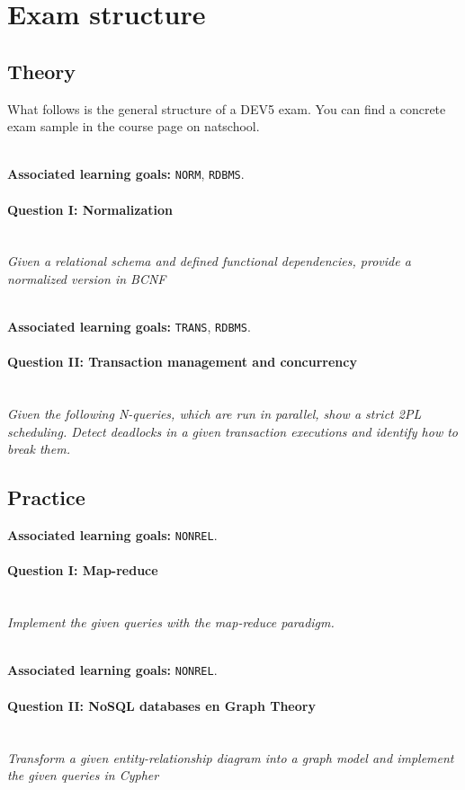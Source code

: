 \section*{Exam structure}
\subsection*{Theory}
What follows is the general structure of a DEV5 exam. You can find a concrete exam sample in the course page on natschool.


\ \\ 
\textbf{Associated learning goals:} \texttt{NORM}, \texttt{RDBMS}.
\paragraph{Question I: Normalization} \ \\ 

\textit{Given a relational schema and defined functional dependencies, provide a normalized version in BCNF}

\ \\ 

\textbf{Associated learning goals:} \texttt{TRANS}, \texttt{RDBMS}.
\paragraph{Question II: Transaction management and concurrency}

\ \\ 

\textit{Given the following N-queries, which are run in parallel, show a strict 2PL scheduling. Detect deadlocks in a given transaction executions and identify how to break them. }

\subsection*{Practice}
\textbf{Associated learning goals:} \texttt{NONREL}.
\paragraph{Question I: Map-reduce}

\ \\ 

\textit{Implement the given queries with the map-reduce paradigm.}

\ \\ 
\textbf{Associated learning goals:} \texttt{NONREL}.
\paragraph{Question II: NoSQL databases en Graph Theory}

\ \\ 

\textit{Transform a given entity-relationship diagram into a graph model and implement the given queries in Cypher}